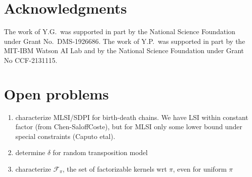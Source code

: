 \documentclass[11pt]{article}
\def\cF{\mathcal{F}}
\theoremstyle{definition}
\begin{document}
{
\section*{Acknowledgments}
The work of Y.G.~was supported in part by the National Science Foundation under Grant No.~DMS-1926686.
The work of Y.P.~was supported in part by the MIT-IBM Watson AI Lab and by the National Science Foundation under Grant No CCF-2131115.
}


\ifdefined\openprob
\section{Open problems}
\begin{enumerate}[label=(\arabic*)]
  \item characterize MLSI/SDPI for birth-death chains. We have LSI within constant factor (from
  Chen-SaloffCoste), but for MLSI only some lower bound under special constraints (Caputo etal).
  \item determine $\delta$ for random transposition model
  \item characterize $\cF_\pi$, the set of factorizable kernels wrt $\pi$, even for uniform $\pi$
\end{enumerate}
\fi



\end{document}
